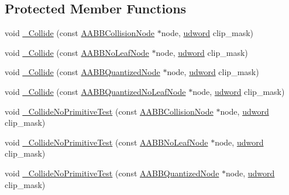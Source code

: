 \subsection*{Protected Member Functions}
\begin{DoxyCompactItemize}
\item 
void \hyperlink{classOpcode_1_1PlanesCollider_afe02fe2d147e793bbeab7a9eb89bed2b}{\+\_\+\+Collide} (const \hyperlink{classOpcode_1_1AABBCollisionNode}{A\+A\+B\+B\+Collision\+Node} $\ast$node, \hyperlink{IceTypes_8h_a44c6f1920ba5551225fb534f9d1a1733}{udword} clip\+\_\+mask)
\item 
void \hyperlink{classOpcode_1_1PlanesCollider_a2fe298e87efaba35deff6e4ad7a56da0}{\+\_\+\+Collide} (const \hyperlink{classOpcode_1_1AABBNoLeafNode}{A\+A\+B\+B\+No\+Leaf\+Node} $\ast$node, \hyperlink{IceTypes_8h_a44c6f1920ba5551225fb534f9d1a1733}{udword} clip\+\_\+mask)
\item 
void \hyperlink{classOpcode_1_1PlanesCollider_a405bf739ddac7a191edee9a8e438bc8a}{\+\_\+\+Collide} (const \hyperlink{classOpcode_1_1AABBQuantizedNode}{A\+A\+B\+B\+Quantized\+Node} $\ast$node, \hyperlink{IceTypes_8h_a44c6f1920ba5551225fb534f9d1a1733}{udword} clip\+\_\+mask)
\item 
void \hyperlink{classOpcode_1_1PlanesCollider_aface806a10833333a7e0473d7b30767b}{\+\_\+\+Collide} (const \hyperlink{classOpcode_1_1AABBQuantizedNoLeafNode}{A\+A\+B\+B\+Quantized\+No\+Leaf\+Node} $\ast$node, \hyperlink{IceTypes_8h_a44c6f1920ba5551225fb534f9d1a1733}{udword} clip\+\_\+mask)
\item 
void \hyperlink{classOpcode_1_1PlanesCollider_ac449d61fe5762a288103ec40c8bf72ce}{\+\_\+\+Collide\+No\+Primitive\+Test} (const \hyperlink{classOpcode_1_1AABBCollisionNode}{A\+A\+B\+B\+Collision\+Node} $\ast$node, \hyperlink{IceTypes_8h_a44c6f1920ba5551225fb534f9d1a1733}{udword} clip\+\_\+mask)
\item 
void \hyperlink{classOpcode_1_1PlanesCollider_a63ae4b22dbfe779be74ca3bd60dd512a}{\+\_\+\+Collide\+No\+Primitive\+Test} (const \hyperlink{classOpcode_1_1AABBNoLeafNode}{A\+A\+B\+B\+No\+Leaf\+Node} $\ast$node, \hyperlink{IceTypes_8h_a44c6f1920ba5551225fb534f9d1a1733}{udword} clip\+\_\+mask)
\item 
void \hyperlink{classOpcode_1_1PlanesCollider_a2c3e44827c703c4e97e224533c0b030c}{\+\_\+\+Collide\+No\+Primitive\+Test} (const \hyperlink{classOpcode_1_1AABBQuantizedNode}{A\+A\+B\+B\+Quantized\+Node} $\ast$node, \hyperlink{IceTypes_8h_a44c6f1920ba5551225fb534f9d1a1733}{udword} clip\+\_\+mask)
\item 

\end{DoxyCompactItemize}
